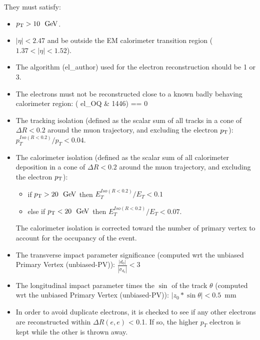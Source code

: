 They must satisfy:
\begin{itemize}
\item $\pt>10~\GeV$.
\item $|\eta|<2.47$ and be outside the EM calorimeter transition
  region ($1.37<|\eta|<1.52$).
\item The algorithm (el\_author) used for the electron reconstruction
  should be 1 or 3.
\item The electrons must not be reconstructed close to a known badly
  behaving calorimeter region: ( el\_OQ \& 1446) == 0
  
  \item The tracking isolation (defined as the scalar sum of all tracks in a cone of $\Delta{}R<0.2$ around the muon trajectory, and excluding the electron $p_{\mathrm{T}}$): $p_{T}^{Iso(R<0.2)}/p_{T}<0.04$.
  \item The calorimeter isolation (defined as the scalar sum of all calorimeter deposition in a cone of $\Delta{}R<0.2$ around the muon trajectory, and excluding the electron $p_{\mathrm{T}}$): 
     \begin{itemize}
     \item if $\pt>20~\GeV$ then $E_{T}^{Iso(R<0.2)}/E_{T}<0.1$
     \item else if $\pt<20~\GeV$ then $E_{T}^{Iso(R<0.2)}/E_{T}<0.07$.
     \end{itemize}
      The calorimeter isolation is corrected toward the number of primary vertex to account for the occupancy of the event.
  

\item The transverse impact parameter significance (computed wrt the unbiased Primary Vertex (unbiased-PV)): $\displaystyle
  \frac{|d_{0}|}{|\sigma_{d_{0}}|}<3$
\item The longitudinal impact parameter times the $\sin$ of the track $\theta$ (computed wrt the unbiased Primary Vertex (unbiased-PV)): $\displaystyle
  |z_{0} * \sin{\theta}| <0.5$~mm
\item In order to avoid duplicate electrons, it is checked to see if any other electrons are reconstructed within $\Delta R(e,e)$  < 0.1.  If so, the higher $p_{T}$ electron is kept while the other is thrown away.



\end{itemize}

